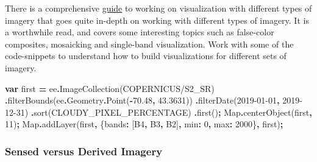 \documentclass[
]{article}
\newenvironment{Shaded}{\begin{snugshade}}{\end{snugshade}}
\newcommand{\AttributeTok}[1]{\textcolor[rgb]{0.77,0.63,0.00}{#1}}
\newcommand{\BuiltInTok}[1]{#1}
\newcommand{\DataTypeTok}[1]{\textcolor[rgb]{0.13,0.29,0.53}{#1}}
\newcommand{\DecValTok}[1]{\textcolor[rgb]{0.00,0.00,0.81}{#1}}
\newcommand{\FloatTok}[1]{\textcolor[rgb]{0.00,0.00,0.81}{#1}}
\newcommand{\FunctionTok}[1]{\textcolor[rgb]{0.00,0.00,0.00}{#1}}
\newcommand{\KeywordTok}[1]{\textcolor[rgb]{0.13,0.29,0.53}{\textbf{#1}}}
\newcommand{\NormalTok}[1]{#1}
\newcommand{\OperatorTok}[1]{\textcolor[rgb]{0.81,0.36,0.00}{\textbf{#1}}}
\newcommand{\StringTok}[1]{\textcolor[rgb]{0.31,0.60,0.02}{#1}}
\begin{document}
There is a comprehensive \href{https://developers.google.com/earth-engine/guides/image_visualization}{guide} to working on visualization with different types of imagery that goes quite in-depth on working with different types of imagery. It is a worthwhile read, and covers some interesting topics such as false-color composites, mosaicking and single-band visualization. Work with some of the code-snippets to understand how to build visualizations for different sets of imagery.

\begin{Shaded}
\begin{Highlighting}[]
\KeywordTok{var}\NormalTok{ first }\OperatorTok{=}\NormalTok{ ee}\OperatorTok{.}\FunctionTok{ImageCollection}\NormalTok{(}\StringTok{\textquotesingle{}COPERNICUS/S2\_SR\textquotesingle{}}\NormalTok{)}
                \OperatorTok{.}\FunctionTok{filterBounds}\NormalTok{(ee}\OperatorTok{.}\AttributeTok{Geometry}\OperatorTok{.}\FunctionTok{Point}\NormalTok{(}\OperatorTok{{-}}\FloatTok{70.48}\OperatorTok{,} \FloatTok{43.3631}\NormalTok{))}
                \OperatorTok{.}\FunctionTok{filterDate}\NormalTok{(}\StringTok{\textquotesingle{}2019{-}01{-}01\textquotesingle{}}\OperatorTok{,} \StringTok{\textquotesingle{}2019{-}12{-}31\textquotesingle{}}\NormalTok{)}
                \OperatorTok{.}\FunctionTok{sort}\NormalTok{(}\StringTok{\textquotesingle{}CLOUDY\_PIXEL\_PERCENTAGE\textquotesingle{}}\NormalTok{)}
                \OperatorTok{.}\FunctionTok{first}\NormalTok{()}\OperatorTok{;}
\BuiltInTok{Map}\OperatorTok{.}\FunctionTok{centerObject}\NormalTok{(first}\OperatorTok{,} \DecValTok{11}\NormalTok{)}\OperatorTok{;}
\BuiltInTok{Map}\OperatorTok{.}\FunctionTok{addLayer}\NormalTok{(first}\OperatorTok{,}\NormalTok{ \{}\DataTypeTok{bands}\OperatorTok{:}\NormalTok{ [}\StringTok{\textquotesingle{}B4\textquotesingle{}}\OperatorTok{,} \StringTok{\textquotesingle{}B3\textquotesingle{}}\OperatorTok{,} \StringTok{\textquotesingle{}B2\textquotesingle{}}\NormalTok{]}\OperatorTok{,} \DataTypeTok{min}\OperatorTok{:} \DecValTok{0}\OperatorTok{,} \DataTypeTok{max}\OperatorTok{:} \DecValTok{2000}\NormalTok{\}}\OperatorTok{,} \StringTok{\textquotesingle{}first\textquotesingle{}}\NormalTok{)}\OperatorTok{;}
\end{Highlighting}
\end{Shaded}

\hypertarget{sensed-versus-derived-imagery}{%
\subsubsection{Sensed versus Derived Imagery}\label{sensed-versus-derived-imagery}}
\end{document}
